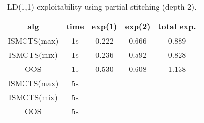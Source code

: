\documentclass[letterpaper]{article}
\newcounter{mlNoteCounter}
\newcommand{\mlnote}[1]{{\scriptsize \color{darkgreen} $\blacksquare$ \refstepcounter{mlNoteCounter}\textsf{[ML]$_{\arabic{mlNoteCounter}}$:{#1}}}}
\begin{document}

% 



\begin{table}
\begin{center}
\begin{tabular}{ccccc}
alg         & time & exp(1) & exp(2) & total exp.\\
\hline
ISMCTS(max) & 1s   & 0.222 & 0.666 & 0.889 \\
ISMCTS(mix) & 1s   & 0.236 & 0.592 & 0.828 \\
OOS         & 1s   & 0.530 & 0.608 & 1.138 \\
\hline
ISMCTS(max) & 5s   &       &       &       \\
ISMCTS(mix) & 5s   &       &       &       \\
OOS         & 5s   &       &       &       \\
\end{tabular}
\caption{LD(1,1) exploitability using partial stitching (depth 2).}
\end{center}
\end{table}

\begin{comment}

\begin{table}
\begin{center}
\begin{tabular}{ccccc}
alg            & time & exp(1) & exp(2) & total exp.\\
\hline
ISMCTS(max)   & 1s   & 0.222  & 0.666  & 0.888 \\
ISMCTS(mix)   & 1s   & 0.250  & 0.563  & 0.813 \\
OOS           & 1s   & 0.394  & 0.289  & 0.683 \\
\hline
ISMCTS(max)   & 5s   &        &        &  \\
ISMCTS(mix)   & 5s   &        &        &  \\
OOS           & 5s   &        &        &  \\
\end{tabular}
\caption{LD(1,1) exploitability using full-stitching method. \mlnote{5 second results will take 68 hours {\tt :)} currently running...}} 
\end{center}
\end{table}

\end{comment}
\end{document}
